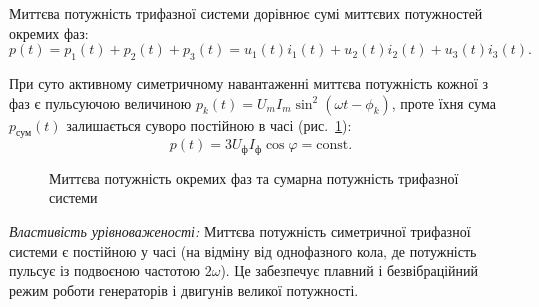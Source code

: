 \documentclass[]{ConspectBook}
\begin{document}
Миттєва потужність трифазної системи дорівнює сумі миттєвих потужностей окремих фаз:
\begin{equation}
	p(t) = p_1(t) + p_2(t) + p_3(t) = u_1(t)i_1(t) + u_2(t)i_2(t) + u_3(t)i_3(t).
\end{equation}

При суто активному симетричному навантаженні миттєва потужність кожної з фаз є пульсуючою величиною $p_k(t) = U_m I_m \sin^2(\omega t - \phi_k)$, проте їхня сума $p_{\text{сум}}(t)$ залишається суворо постійною в часі (рис.~\ref{pic:ThreePhasePower}):
\begin{equation}
	p(t) = 3 U_\text{ф} I_\text{ф} \cos\varphi = \text{const}.
\end{equation}

\begin{figure}[h!]
	\centering
	\caption{Миттєва потужність окремих фаз та сумарна потужність трифазної системи}
	\label{pic:ThreePhasePower}
\end{figure}

\emph{Властивість урівноваженості:} Миттєва потужність симетричної трифазної системи є постійною у часі (на відміну від однофазного кола, де потужність пульсує із подвоєною частотою $2\omega$). Це забезпечує плавний і безвібраційний режим роботи генераторів і двигунів великої потужності.
\end{document}
